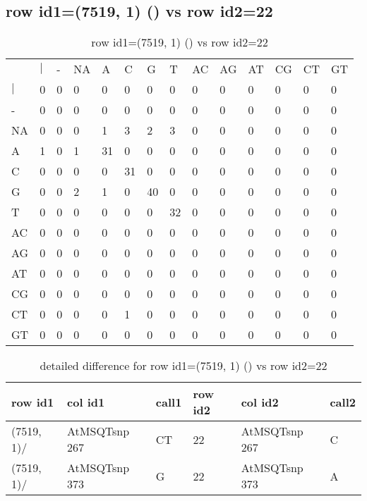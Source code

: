 \subsection{row id1=(7519, 1) () vs row id2=22}
\begin{center}
\begin{longtable}{|l|l|l|l|l|l|l|l|l|l|l|l|l|l|}
\caption{row id1=(7519, 1) () vs row id2=22} \label{table_dm328}\\
\hline
\\
\hline
&$|$&-&NA&A&C&G&T&AC&AG&AT&CG&CT&GT\\
$|$&0&0&0&0&0&0&0&0&0&0&0&0&0\\
-&0&0&0&0&0&0&0&0&0&0&0&0&0\\
NA&0&0&0&1&3&2&3&0&0&0&0&0&0\\
A&1&0&1&31&0&0&0&0&0&0&0&0&0\\
C&0&0&0&0&31&0&0&0&0&0&0&0&0\\
G&0&0&2&1&0&40&0&0&0&0&0&0&0\\
T&0&0&0&0&0&0&32&0&0&0&0&0&0\\
AC&0&0&0&0&0&0&0&0&0&0&0&0&0\\
AG&0&0&0&0&0&0&0&0&0&0&0&0&0\\
AT&0&0&0&0&0&0&0&0&0&0&0&0&0\\
CG&0&0&0&0&0&0&0&0&0&0&0&0&0\\
CT&0&0&0&0&1&0&0&0&0&0&0&0&0\\
GT&0&0&0&0&0&0&0&0&0&0&0&0&0\\
\hline
\end{longtable}
\end{center}

\begin{center}
\begin{longtable}{|l|l|l|l|l|l|}
\caption{detailed difference for row id1=(7519, 1) () vs row id2=22} \label{table_dm329}\\
\hline
row id1&col id1&call1&row id2&col id2&call2\\
\hline
(7519, 1)/&AtMSQTsnp 267&CT&22&AtMSQTsnp 267&C\\
(7519, 1)/&AtMSQTsnp 373&G&22&AtMSQTsnp 373&A\\
\hline
\end{longtable}
\end{center}

